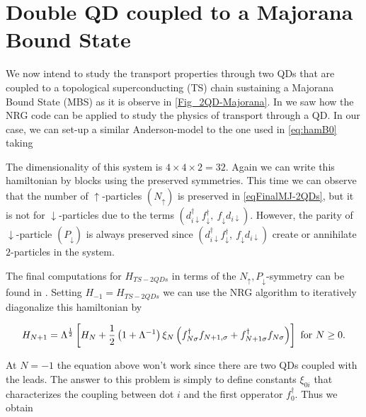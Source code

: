 \chapter{Double QD coupled to a Majorana Bound State}





We now intend to study the transport properties through two QDs that
are coupled to a topological superconducting (TS) chain sustaining
a Majorana Bound State (MBS) as it is observe in \ref{Fig_2QD-Majorana}.
In  we saw how the NRG
code can be applied to study the physics of transport through a QD.
In our case, we can set-up a similar Anderson-model to the one used
in \ref{eq:hamB0} taking


The dimensionality of this system is $4\times4\times2=32.$ Again
we can write this hamiltonian by blocks using the preserved symmetries.
This time we can observe that the number of $\uparrow$-particles
$\left(N_{\uparrow}\right)$ is preserved in \ref{eqFinalMJ-2QDs},
but it is not for $\downarrow$-particles due to the terms $\left(d_{i\downarrow}^{\dagger}f_{\downarrow}^{\dagger},\ f_{\downarrow}d_{i\downarrow}\right)$.
However, the parity of $\downarrow$-particle $\left(P_{\downarrow}\right)$
is always preserved since $\left(d_{i\downarrow}^{\dagger}f_{\downarrow}^{\dagger},\ f_{\downarrow}d_{i\downarrow}\right)$
create or annihilate $2$-particles in the system. 

The final computations for $H_{TS-2QDs}$ in terms of the $N_{\uparrow},P_{\downarrow}$-symmetry
can be found in .
Setting $H_{-1}=H_{TS-2QDs}$ we can use the NRG algorithm 
to iteratively diagonalize this hamiltonian by 

\[
H_{N+1}=\Lambda^{\frac{1}{2}}\left[H_{N}+\frac{1}{2}\left(1+\Lambda^{-1}\right)\xi_{N}\left(f_{N\sigma}^{\dagger}f_{N+1,\sigma}+f_{N+1\sigma}^{\dagger}f_{N\sigma}\right)\right]\ \mbox{for \ensuremath{N\geq0}}.
\]


At $N=-1$ the equation above won't work since there are two QDs coupled
with the leads. The answer to this problem is simply to define constants
$\xi_{0i}$ that characterizes the coupling between dot $i$ and the
first opperator $f_{0}^{\dagger}.$ Thus we obtain 

